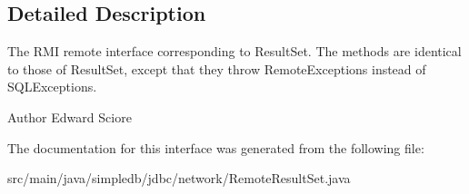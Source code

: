 \subsection{Detailed Description}
The R\+MI remote interface corresponding to Result\+Set. The methods are identical to those of Result\+Set, except that they throw Remote\+Exceptions instead of S\+Q\+L\+Exceptions. \begin{DoxyAuthor}{Author}
Edward Sciore 
\end{DoxyAuthor}


The documentation for this interface was generated from the following file\+:\begin{DoxyCompactItemize}
\item 
src/main/java/simpledb/jdbc/network/Remote\+Result\+Set.\+java\end{DoxyCompactItemize}
